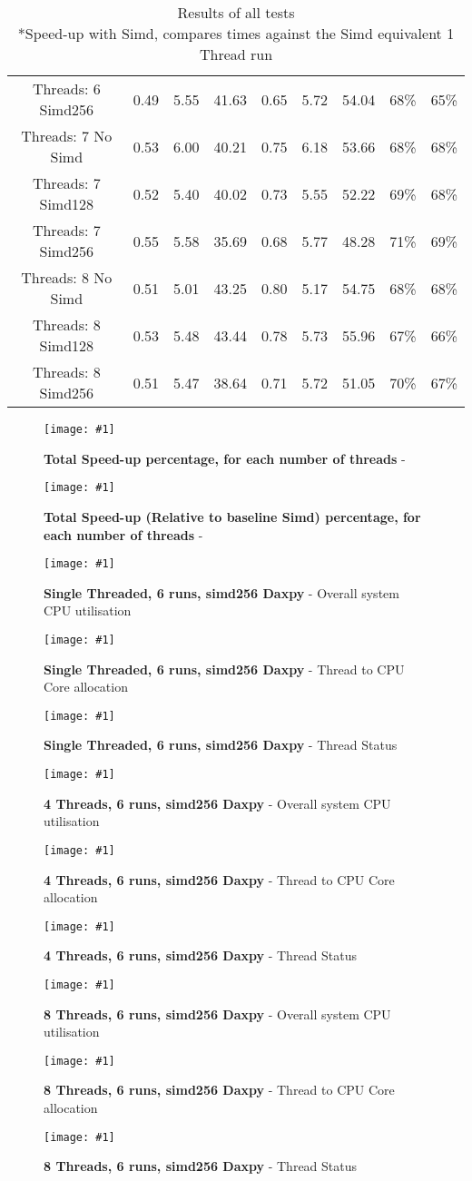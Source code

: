 \documentclass[conference]{acmsiggraph}
\newcommand{\figuremacroF}[4]{
	\begin{figure*}[t] %
		\centering
		\texttt{[image: \#1]}
		\caption[#2]{\textbf{#2} - #3}
		\label{fig:#1}
	\end{figure*}
}
\begin{document}
\begin{table}[b]
{{\begin{minipage}{\textwidth}
\begin{tabular}{ccccccccc}
					Threads: 6 Simd256	&	0.49	&	5.55	&	41.63	&	0.65	&	5.72	&	54.04	&	68\%	&	65\%\\
					Threads: 7 No Simd	&	0.53	&	6.00	&	40.21	&	0.75	&	6.18	&	53.66	&	68\%	&	68\%\\
					Threads: 7 Simd128	&	0.52	&	5.40	&	40.02	&	0.73	&	5.55	&	52.22	&	69\%	&	68\%\\
					Threads: 7 Simd256	&	0.55	&	5.58	&	35.69	&	0.68	&	5.77	&	48.28	&	71\%	&	69\%\\
					Threads: 8 No Simd	&	0.51	&	5.01	&	43.25	&	0.80	&	5.17	&	54.75	&	68\%	&	68\%\\
					Threads: 8 Simd128	&	0.53	&	5.48	&	43.44	&	0.78	&	5.73	&	55.96	&	67\%	&	66\%\\
					Threads: 8 Simd256	&	0.51	&	5.47	&	38.64	&	0.71	&	5.72	&	51.05	&	70\%	&	67\%\\
					\hline
				\end{tabular}
				
				\caption[Table caption text]{Results of all tests\\
					*Speed-up with Simd, compares times against the	Simd equivalent 1 Thread run}
				\label{table:results}
			\end{minipage} }
		}
	\end{table}
	
	\figuremacroF
	{graph2}
	{Total Speed-up percentage, for each number of threads}
	{}
	{1.0}
	
	\figuremacroF
	{graph1}
	{Total Speed-up (Relative to baseline Simd) percentage, for each number of threads}
	{}
	{1.0}

\figuremacroF
{t1i8simd256conc}
{Single Threaded, 6 runs, simd256 Daxpy}
{Overall system CPU utilisation}
{1.0}

\figuremacroF
{t1i8simd256cond}
{Single Threaded, 6 runs, simd256 Daxpy}
{Thread to CPU Core allocation}
{1.0}

\figuremacroF
{t1i8simd256conp}
{Single Threaded, 6 runs, simd256 Daxpy}
{Thread Status}
{1.0}

\figuremacroF
{t4i8simd256conc}
{4 Threads, 6 runs, simd256 Daxpy}
{Overall system CPU utilisation}
{1.0}

\figuremacroF
{t4i8simd256cond}
{4 Threads, 6 runs, simd256 Daxpy}
{Thread to CPU Core allocation}
{1.0}

\figuremacroF
{t4i8simd256conp}
{4 Threads, 6 runs, simd256 Daxpy}
{Thread Status}
{1.0}

\figuremacroF
{t8i8simd256conc}
{8 Threads, 6 runs, simd256 Daxpy}
{Overall system CPU utilisation}
{1.0}

\figuremacroF
{t8i8simd256cond}
{8 Threads, 6 runs, simd256 Daxpy}
{Thread to CPU Core allocation}
{1.0}

\figuremacroF
{t8i8simd256conp}
{8 Threads, 6 runs, simd256 Daxpy}
{Thread Status}
{1.0}
\end{document}

